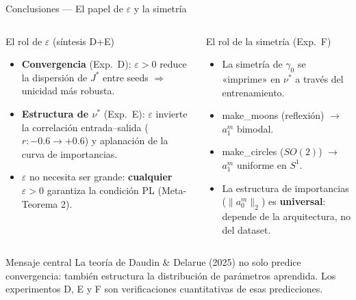 \documentclass[10pt]{beamer}
\begin{document}
\begin{frame}{Conclusiones — El papel de $\varepsilon$ y la simetría}

\begin{columns}
\begin{block}{El rol de $\varepsilon$ (síntesis D+E)}
  \begin{itemize}
    \item \textbf{Convergencia} (Exp.\ D): $\varepsilon>0$ reduce la dispersión de $J^*$ entre seeds $\Rightarrow$ unicidad más robusta.
    \medskip
    \item \textbf{Estructura de $\nu^*$} (Exp.\ E): $\varepsilon$ invierte la correlación entrada--salida ($r: -0.6 \to +0.6$) y aplanación de la curva de importancias.
    \medskip
    \item $\varepsilon$ no necesita ser grande: \textbf{cualquier $\varepsilon>0$} garantiza la condición PL (Meta-Teorema 2).
  \end{itemize}
\end{block}

\begin{block}{El rol de la simetría (Exp.\ F)}
  \begin{itemize}
    \item La simetría de $\gamma_0$ se «imprime» en $\nu^*$ a través del entrenamiento.
    \medskip
    \item make\_moons (reflexión) $\to$ $a_1^m$ bimodal.
    \medskip
    \item make\_circles ($SO(2)$) $\to$ $a_1^m$ uniforme en $S^1$.
    \medskip
    \item La estructura de importancias ($\|a_0^m\|_2$) es \textbf{universal}: depende de la arquitectura, no del dataset.
  \end{itemize}
\end{block}
\end{columns}

\bigskip
\begin{alertblock}{Mensaje central}
  La teoría de Daudin \& Delarue (2025) no solo predice convergencia: también estructura la distribución de parámetros aprendida. Los experimentos D, E y F son verificaciones cuantitativas de esas predicciones.
\end{alertblock}

\end{frame}
\end{document}

